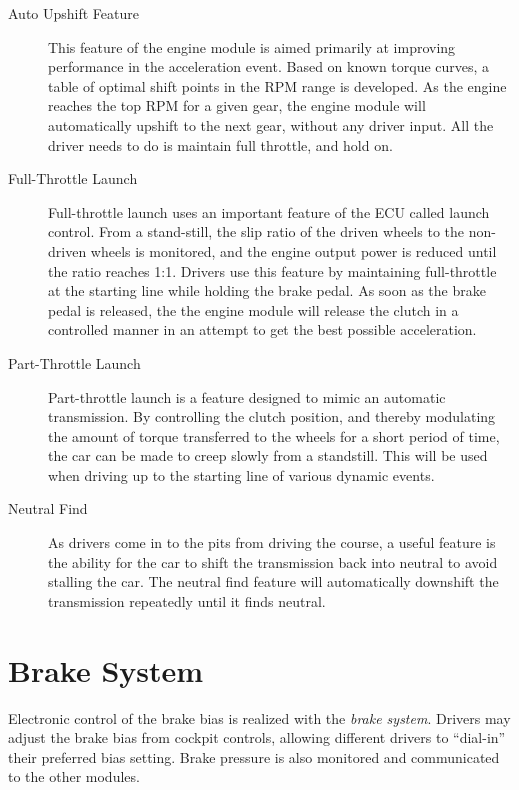 \begin{description}

\item[Auto Upshift Feature]

This feature of the engine module is aimed primarily at improving performance in the acceleration event. Based on known torque curves, a table of optimal shift points in the RPM range is developed. As the engine reaches the top RPM for a given gear, the engine module will automatically upshift to the next gear, without any driver input. All the driver needs to do is maintain full throttle, and hold on.

\item[Full-Throttle Launch]
Full-throttle launch uses an important feature of the ECU called launch control. From a stand-still, the slip ratio of the driven wheels to the non-driven wheels is monitored, and the engine output power is reduced until the ratio reaches 1:1. Drivers use this feature by maintaining full-throttle at the starting line while holding the brake pedal. As soon as the brake pedal is released, the the engine module will release the clutch in a controlled manner in an attempt to get the best possible acceleration.

\item[Part-Throttle Launch]
Part-throttle launch is a feature designed to mimic an automatic transmission. By controlling the clutch position, and thereby modulating the amount of torque transferred to the wheels for a short period of time, the car can be made to creep slowly from a standstill. This will be used when driving up to the starting line of various dynamic events.

\item[Neutral Find]
As drivers come in to the pits from driving the course, a useful feature is the ability for the car to shift the transmission back into neutral to avoid stalling the car. The neutral find feature will automatically downshift the transmission repeatedly until it finds neutral.

\end{description}

%
%

\section{Brake System}
\label{brake_system}

Electronic control of the brake bias is realized with the \emph{brake system}. Drivers may adjust the brake bias from cockpit controls, allowing different drivers to {}``dial-in'' their preferred bias setting. Brake pressure is also monitored and communicated to the other modules.

